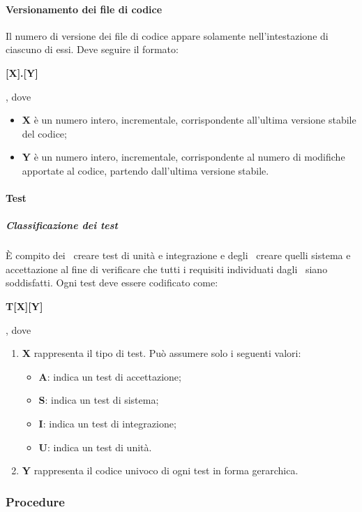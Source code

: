 \documentclass[../NormeProgetto.text]{subfiles}
\begin{document}
				\paragraph{Versionamento dei file di codice}
					Il numero di versione dei file di codice appare solamente nell'intestazione di ciascuno di essi. Deve seguire il formato:
					\begin{center}\textbf{[X].[Y]}\end{center}, dove
					\begin{itemize}
						\item \textbf{X} è un numero intero, incrementale, corrispondente all'ultima versione stabile del codice;
						\item \textbf{Y} è un numero intero, incrementale, corrispondente al numero di modifiche apportate al codice, partendo dall'ultima versione stabile.
					\end{itemize}
					
				\paragraph{Test}
					\subparagraph{Classificazione dei test}
					È compito dei \programmatori\ creare test di unità e integrazione e degli \analisti\ creare quelli sistema e accettazione al fine di verificare che tutti i requisiti individuati dagli \analisti\ siano soddisfatti. Ogni test deve essere codificato come:
					\begin{center}\textbf{T[X][Y]}\end{center}, dove
						\begin{enumerate}
							\item \textbf{X} rappresenta il tipo di test. Può assumere solo i seguenti valori:
							\begin{itemize}
								\item \textbf{A}: indica un test di accettazione;
								\item \textbf{S}: indica un test di sistema;
								\item \textbf{I}: indica un test di integrazione;
								\item \textbf{U}: indica un test di unità.
							\end{itemize}
							
							\item \textbf{Y} rappresenta il codice univoco di ogni test in forma gerarchica.
						\end{enumerate}
					
		\subsubsection{Procedure}
\end{document}
